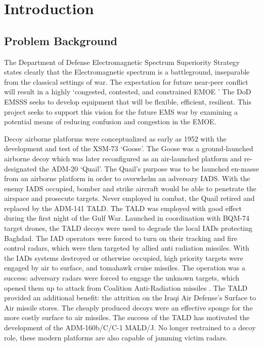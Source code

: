 \chapter{Introduction}
\label{ch:introduction}
\glsresetall

\section{Problem Background}
\label{ch:problem_statement}

The Department of Defense Electromagnetic Spectrum Superiority Strategy states clearly that the Electromagnetic spectrum is a battleground, inseparable from the classical settings of war. The expectation for future near-peer conflict will result in a highly `congested, contested, and constrained \gls{EMOE} \cite{DOD_ESSS}' The DoD EMSSS seeks to develop equipment that will be flexible, efficient, resilient. This project seeks to support this vision for the future EMS war by examining a potential means of reducing confusion and congestion in the EMOE.

Decoy airborne platforms were conceptualized as early as 1952 with the development and test of the XSM-73 `Goose'. The Goose was a ground-launched airborne decoy which was later reconfigured as an air-launched platform and re-designated the ADM-20 `Quail'. The Quail's purpose was to be launched en-masse from an airborne platform in order to overwhelm an adversary \gls{IADS}. With the enemy IADS occupied, bomber and strike aircraft would be able to penetrate the airspace and prosecute targets. Never employed in combat, the Quail retired and replaced by the ADM-141 \gls{TALD}. The TALD was employed with good effect during the first night of the Gulf War. Launched in coordination with BQM-74 target drones, the TALD decoys were used to degrade the local IADs protecting Baghdad. The IAD operators were forced to turn on their tracking and fire control radars, which were then targeted by allied anti radiation missiles. With the IADs systems destroyed or otherwise occupied, high priority targets were engaged by air to surface, and tomahawk cruise missiles. The operation was a success:  adversary radars were forced to engage the unknown targets, which opened them up to attack from Coalition Anti-Radiation missiles \cite{Air_War}. The TALD provided an additional benefit: the attrition on the Iraqi Air Defense's Surface to Air missile stores. The cheaply produced decoys were an effective sponge for the more costly surface to air missiles. The success of the TALD has motivated the development of the ADM-160b/C/C-1 \gls{MALD/J}. No longer restrained to a decoy role, these modern platforms are also capable of jamming victim radars.

